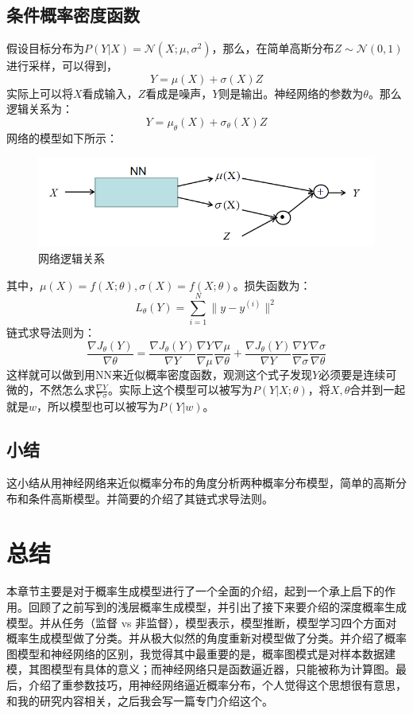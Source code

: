 \documentclass[a4paper]{article}
\begin{document}
\subsection{条件概率密度函数}
假设目标分布为$P(Y|X)=\mathcal{N}(X;\mu,\sigma^2)$，那么，在简单高斯分布$Z \sim \mathcal{N}(0,1)$进行采样，可以得到，
\begin{equation}
    Y=\mu(X) + \sigma(X)Z
\end{equation}
实际上可以将$X$看成输入，$Z$看成是噪声，$Y$则是输出。神经网络的参数为$\theta$。那么逻辑关系为：
\begin{equation}
    Y = \mu_\theta(X) + \sigma_\theta(X)Z
\end{equation}
网络的模型如下所示：
\begin{figure}[H]
    \centering
    \includegraphics[width=.65\textwidth]{微信图片_20200601202036.png}
    \caption{网络逻辑关系}
    \label{fig:my_label_1}
\end{figure}
其中，$\mu(X)=f(X;\theta),\sigma(X)=f(X;\theta)$。损失函数为：
\begin{equation}
    L_\theta(Y) = \sum_{i=1}^N \|y-y^{(i)}\|^2
\end{equation}
链式求导法则为：
\begin{equation}
    \frac{\nabla J_\theta(Y)}{\nabla \theta} = \frac{\nabla J_\theta(Y)}{\nabla Y}\frac{\nabla Y}{\nabla \mu}\frac{\nabla \mu}{\nabla \theta} +
    \frac{\nabla J_\theta(Y)}{\nabla Y}\frac{\nabla Y}{\nabla \sigma}\frac{\nabla \sigma}{\nabla \theta}
\end{equation}
这样就可以做到用NN来近似概率密度函数，观测这个式子发现$Y$必须要是连续可微的，不然怎么求$\frac{\nabla Y}{\nabla \sigma}$。实际上这个模型可以被写为$P(Y|X;\theta)$，将$X,\theta$合并到一起就是$w$，所以模型也可以被写为$P(Y|w)$。

\subsection{小结}
这小结从用神经网络来近似概率分布的角度分析两种概率分布模型，简单的高斯分布和条件高斯模型。并简要的介绍了其链式求导法则。

\section{总结}
本章节主要是对于概率生成模型进行了一个全面的介绍，起到一个承上启下的作用。回顾了之前写到的浅层概率生成模型，并引出了接下来要介绍的深度概率生成模型。并从任务（监督 vs 非监督），模型表示，模型推断，模型学习四个方面对概率生成模型做了分类。并从极大似然的角度重新对模型做了分类。并介绍了概率图模型和神经网络的区别，我觉得其中最重要的是，概率图模式是对样本数据建模，其图模型有具体的意义；而神经网络只是函数逼近器，只能被称为计算图。最后，介绍了重参数技巧，用神经网络逼近概率分布，个人觉得这个思想很有意思，和我的研究内容相关，之后我会写一篇专门介绍这个。
\end{document}
